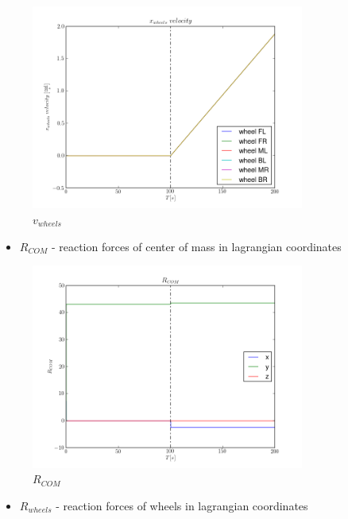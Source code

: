 \begin{figure}[H]
  \centering
    \includegraphics[width=0.8\textwidth]{vWHEELS4}
  \caption{$v_{wheels}$}
\end{figure}

\begin{itemize}
  \item $R_{COM}$ - reaction forces of center of mass in lagrangian coordinates
\end{itemize}

\begin{figure}[H]
  \centering
    \includegraphics[width=0.8\textwidth]{pCOM4}
  \caption{$R_{COM}$}
\end{figure}

\begin{itemize}
  \item $R_{wheels}$ - reaction forces of wheels in lagrangian coordinates
\end{itemize}


